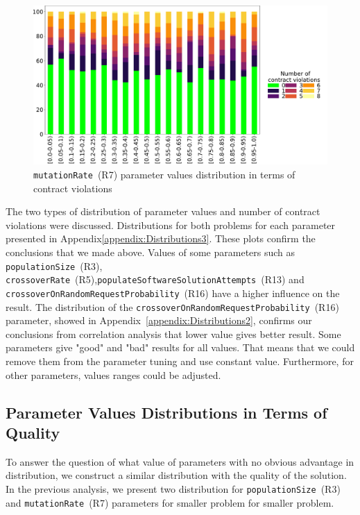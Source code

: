 \begin{figure}
	\centering
	\includegraphics[width=\textwidth]{images/mutationRate_gradient_500dpi.pdf}
	\caption[\texttt{mutationRate}~(R7) parameter values distribution]{\texttt{mutationRate}~(R7) parameter values distribution in terms of contract violations}
	\label{fig:mutationRate_gradient}
\end{figure}

The two types of distribution of parameter values and number of contract violations were discussed. Distributions for both problems for each parameter presented in Appendix\ref{appendix:Distributions3}. These plots confirm the conclusions that we made above. Values of some parameters such as \texttt{populationSize}~(R3), \texttt{crossoverRate}~(R5),\linebreak \texttt{po\-pu\-la\-te\-Soft\-wa\-re\-So\-lu\-tion\-Attempts}~(R13) and \texttt{cross\-over\-On\-Ran\-dom\-Re\-qu\-est\-Pro\-ba\-bi\-li\-ty}~(R16) have a higher influence on the result.
The distribution  of the \texttt{cross\-over\-On\-Ran\-dom\-Re\-quest\-Pro\-ba\-bi\-lity}~(R16) parameter, showed in Appendix~\ref{appendix:Distributions2}, confirms our conclusions from correlation analysis that lower value gives better result. 
Some parameters give "good" and "bad" results for all values. That means that we could remove them from the parameter tuning and use constant value. Furthermore, for other parameters, values ranges could be adjusted.

\subsection{Parameter Values Distributions in Terms of Quality}
To answer the question of what value of parameters with no obvious advantage in distribution, we construct a similar distribution with the quality of the solution.
In the previous analysis, we present two distribution for \texttt{populationSize}~(R3) and \texttt{mutationRate}~(R7) parameters for smaller problem for smaller problem.

